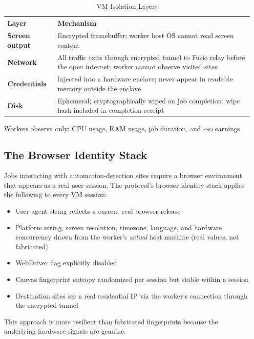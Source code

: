 \documentclass[10pt,twocolumn]{article}
\newcommand{\fso}{\textsc{fso}}
\begin{document}
\begin{table}[H]
\centering
\caption{VM Isolation Layers}
\label{tab:isolation}
\renewcommand{\arraystretch}{1.3}
\begin{tabularx}{\columnwidth}{>{\bfseries\small}p{1.8cm} X}
\toprule
Layer & Mechanism \\
\midrule
Screen output & Encrypted framebuffer; worker host OS cannot read screen content \\
Network & All traffic exits through encrypted tunnel to Fusio relay before the open internet; worker cannot observe visited sites \\
Credentials & Injected into a hardware enclave; never appear in readable memory outside the enclave \\
Disk & Ephemeral; cryptographically wiped on job completion; wipe hash included in completion receipt \\
\bottomrule
\end{tabularx}
\end{table}

\noindent Workers observe only: CPU usage, RAM usage, job duration, and \fso{} earnings.

\subsection{The Browser Identity Stack}

Jobs interacting with automation-detection sites require a browser environment that appears as a real user session. The protocol's browser identity stack applies the following to every VM session:

\begin{itemize}[noitemsep,leftmargin=*,topsep=2pt]
  \item User-agent string reflects a current real browser release
  \item Platform string, screen resolution, timezone, language, and hardware concurrency drawn from the worker's \emph{actual} host machine (real values, not fabricated)
  \item WebDriver flag explicitly disabled
  \item Canvas fingerprint entropy randomized per session but stable within a session
  \item Destination sites see a real residential IP via the worker's connection through the encrypted tunnel
\end{itemize}

This approach is more resilient than fabricated fingerprints because the underlying hardware signals are genuine.
\end{document}
